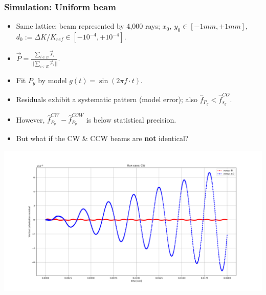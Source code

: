\documentclass{beamer}
\begin{document}
\begin{frame}
  \frametitle{Simulation: Uniform beam}
  \begin{itemize}
    \item Same lattice; beam represented by 4,000 rays; $x_0,~y_0\in [-1mm, +1mm]$, $d_0:=\Delta K/K_{ref} \in [-10^{-4}, +10^{-4}]$.
    \item $\vec P = \frac{\sum_{i\in E} \vec s_i}{||\sum_{i\in E} \vec s_i||}.$
    \item Fit $P_y$ by model $g(t) = \sin(2\pi f\cdot t)$.
    \item Residuals exhibit a systematic pattern (model error); also $\hat f_{P_y} < \hat f_{s_y}^{CO}$.
    \item However, $\hat f_{P_y}^{CW} - \hat f_{P_y}^{CCW}$ is below statistical precision.
    \item But what if the CW \& CCW beams are \textbf{not} identical?
  \end{itemize}
  \vspace*{-.3cm}
  \begin{center}
    \includegraphics[height=.5\paperheight]{img/spin_axis_motion/CW_polarization_residual_full}
  \end{center}
\end{frame}
\end{document}
